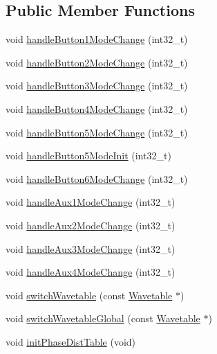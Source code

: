 \subsection*{Public Member Functions}
\begin{DoxyCompactItemize}
\item 
void \mbox{\hyperlink{class_via_sync_ade251d6864dbf40a30d530113a8db7c4}{handle\+Button1\+Mode\+Change}} (int32\+\_\+t)
\item 
void \mbox{\hyperlink{class_via_sync_a72c6811eda10d4561514a3e303c576ca}{handle\+Button2\+Mode\+Change}} (int32\+\_\+t)
\item 
void \mbox{\hyperlink{class_via_sync_a776b4208e3e60ed260944712c1e6b373}{handle\+Button3\+Mode\+Change}} (int32\+\_\+t)
\item 
void \mbox{\hyperlink{class_via_sync_a87591fbbe499a88655b5bfda7fa66ac3}{handle\+Button4\+Mode\+Change}} (int32\+\_\+t)
\item 
void \mbox{\hyperlink{class_via_sync_aae492fa98176f80a1b7c8b93ef94d298}{handle\+Button5\+Mode\+Change}} (int32\+\_\+t)
\item 
void \mbox{\hyperlink{class_via_sync_afca54d07d9a9e69aadf0e902fc170da9}{handle\+Button5\+Mode\+Init}} (int32\+\_\+t)
\item 
void \mbox{\hyperlink{class_via_sync_a6de0281ea552e8d2e484bbc25ccee2fe}{handle\+Button6\+Mode\+Change}} (int32\+\_\+t)
\item 
void \mbox{\hyperlink{class_via_sync_acd48ad7bc9c9c20dbceb3742bf6958c4}{handle\+Aux1\+Mode\+Change}} (int32\+\_\+t)
\item 
void \mbox{\hyperlink{class_via_sync_a95d851d451b6b7ea874dd27737e217a0}{handle\+Aux2\+Mode\+Change}} (int32\+\_\+t)
\item 
void \mbox{\hyperlink{class_via_sync_a61945cde541c66ac456eb57fa72968e5}{handle\+Aux3\+Mode\+Change}} (int32\+\_\+t)
\item 
void \mbox{\hyperlink{class_via_sync_a398169bcd5efcd7067bf45dcb871a2b5}{handle\+Aux4\+Mode\+Change}} (int32\+\_\+t)
\item 
void \mbox{\hyperlink{class_via_sync_a34eb31372109ffcf9b3c43a4ecb2c97c}{switch\+Wavetable}} (const \mbox{\hyperlink{struct_wavetable}{Wavetable}} $\ast$)
\item 
void \mbox{\hyperlink{class_via_sync_acdf292720dd88a591bdaf2a05e6cb10e}{switch\+Wavetable\+Global}} (const \mbox{\hyperlink{struct_wavetable}{Wavetable}} $\ast$)
\item 
void \mbox{\hyperlink{class_via_sync_a3940ed301b8df340103f8aca442be348}{init\+Phase\+Dist\+Table}} (void)

\end{DoxyCompactItemize}
